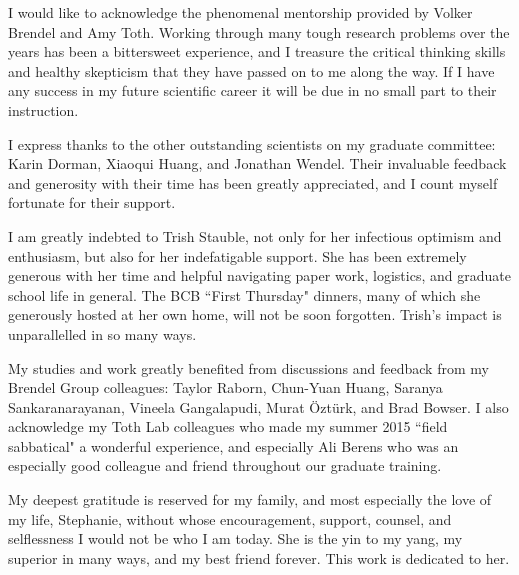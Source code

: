 
I would like to acknowledge the phenomenal mentorship provided by Volker Brendel and Amy Toth.
Working through many tough research problems over the years has been a bittersweet experience, and I treasure the critical thinking skills and healthy skepticism that they have passed on to me along the way.
If I have any success in my future scientific career it will be due in no small part to their instruction.

I express thanks to the other outstanding scientists on my graduate committee: Karin Dorman, Xiaoqui Huang, and Jonathan Wendel.
Their invaluable feedback and generosity with their time has been greatly appreciated, and I count myself fortunate for their support.

I am greatly indebted to Trish Stauble, not only for her infectious optimism and enthusiasm, but also for her indefatigable support.
She has been extremely generous with her time and helpful navigating paper work, logistics, and graduate school life in general.
The BCB ``First Thursday" dinners, many of which she generously hosted at her own home, will not be soon forgotten.
Trish's impact is unparallelled in so many ways.

My studies and work greatly benefited from discussions and feedback from my Brendel Group colleagues:
Taylor Raborn, Chun-Yuan Huang, Saranya Sankaranarayanan, Vineela Gangalapudi, Murat {\"O}zt{\"u}rk, and Brad Bowser.
I also acknowledge my Toth Lab colleagues who made my summer 2015 ``field sabbatical" a wonderful experience, and especially Ali Berens who was an especially good colleague and friend throughout our graduate training.

My deepest gratitude is reserved for my family, and most especially the love of my life, Stephanie, without whose encouragement, support, counsel, and selflessness I would not be who I am today.
She is the yin to my yang, my superior in many ways, and my best friend forever.
This work is dedicated to her.
